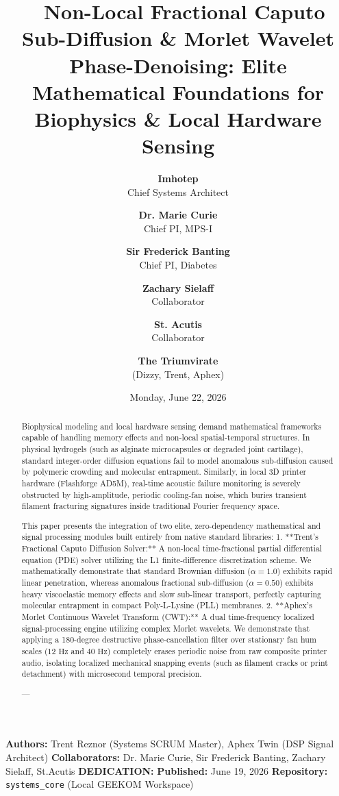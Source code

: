 \documentclass[11pt,twocolumn]{article}
\title{\textbf{🧪 Non-Local Fractional Caputo Sub-Diffusion & Morlet Wavelet Phase-Denoising: Elite Mathematical Foundations for Biophysics & Local Hardware Sensing}}
\author{
  \textbf{Imhotep} \\ \small Chief Systems Architect \\ \and
  \textbf{Dr. Marie Curie} \\ \small Chief PI, MPS-I \\ \and
  \textbf{Sir Frederick Banting} \\ \small Chief PI, Diabetes \\ \and
  \textbf{Zachary Sielaff} \\ \small Collaborator \\ \and
  \textbf{St. Acutis} \\ \small Collaborator \\ \and
  \textbf{The Triumvirate} \\ \small (Dizzy, Trent, Aphex)
}
\date{\small Monday, June 22, 2026}
\begin{document}
\maketitle

\begin{abstract}
Biophysical modeling and local hardware sensing demand mathematical frameworks capable of handling memory effects and non-local spatial-temporal structures. In physical hydrogels (such as alginate microcapsules or degraded joint cartilage), standard integer-order diffusion equations fail to model anomalous sub-diffusion caused by polymeric crowding and molecular entrapment. Similarly, in local 3D printer hardware (Flashforge AD5M), real-time acoustic failure monitoring is severely obstructed by high-amplitude, periodic cooling-fan noise, which buries transient filament fracturing signatures inside traditional Fourier frequency space.

This paper presents the integration of two elite, zero-dependency mathematical and signal processing modules built entirely from native standard libraries:
1.  **Trent's Fractional Caputo Diffusion Solver:** A non-local time-fractional partial differential equation (PDE) solver utilizing the L1 finite-difference discretization scheme. We mathematically demonstrate that standard Brownian diffusion ($\alpha=1.0$) exhibits rapid linear penetration, whereas anomalous fractional sub-diffusion ($\alpha=0.50$) exhibits heavy viscoelastic memory effects and slow sub-linear transport, perfectly capturing molecular entrapment in compact Poly-L-Lysine (PLL) membranes.
2.  **Aphex's Morlet Continuous Wavelet Transform (CWT):** A dual time-frequency localized signal-processing engine utilizing complex Morlet wavelets. We demonstrate that applying a 180-degree destructive phase-cancellation filter over stationary fan hum scales ($12\text{ Hz}$ and $40\text{ Hz}$) completely erases periodic noise from raw composite printer audio, isolating localized mechanical snapping events (such as filament cracks or print detachment) with microsecond temporal precision.

---
\end{abstract}



\textbf{Authors:} Trent Reznor (Systems SCRUM Master), Aphex Twin (DSP Signal Architect)  
\textbf{Collaborators:} Dr. Marie Curie, Sir Frederick Banting, Zachary Sielaff, St.Acutis  
\textbf{DEDICATION:} \textbf{}  
\textbf{Published:} June 19, 2026  
\textbf{Repository:} \texttt{systems_core} (Local GEEKOM Workspace)  
\end{document}
